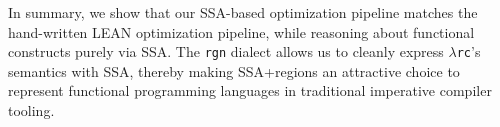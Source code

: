 \documentclass[conference]{IEEEtran}
\newcommand{\rgn}{\textcolor{pairedSixDarkRed}{\texttt{rgn}}}
\newcommand{\lambdarc}{\ensuremath{\lambda}\texttt{rc}}
\begin{document}
In summary, we show that our SSA-based optimization pipeline matches the hand-written
LEAN optimization pipeline, while reasoning about functional constructs purely via SSA.
The \rgn{} dialect allows us to cleanly
express \lambdarc{}'s semantics with SSA, thereby making SSA+regions
an attractive choice to represent functional programming languages in traditional
imperative compiler tooling.


%


\end{document}
